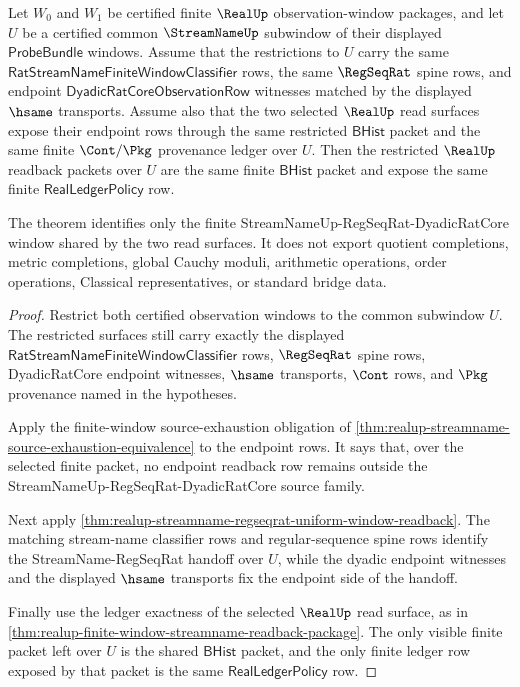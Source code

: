 \begin{theorem}
\label{thm:realup-streamname-regseqrat-common-window-pullback}
Let $W_0$ and $W_1$ be certified finite $\RealUp$ observation-window packages,
and let $U$ be a certified common $\StreamNameUp$ subwindow of their displayed
$\mathsf{ProbeBundle}$ windows. Assume that the restrictions to $U$ carry the
same $\mathsf{RatStreamNameFiniteWindowClassifier}$ rows, the same
$\RegSeqRat$ spine rows, and endpoint
$\mathsf{DyadicRatCoreObservationRow}$ witnesses matched by the displayed
$\hsame$ transports. Assume also that the two selected
$\RealUp$ read surfaces expose their endpoint rows through the same restricted
$\mathsf{BHist}$ packet and the same finite $\Cont/\Pkg$ provenance ledger over
$U$. Then the restricted $\RealUp$ readback packets over $U$ are the same
finite $\mathsf{BHist}$ packet and expose the same finite
$\mathsf{RealLedgerPolicy}$ row.

The theorem identifies only the finite StreamNameUp-RegSeqRat-DyadicRatCore
window shared by the two read surfaces. It does not export quotient
completions, metric completions, global Cauchy moduli, arithmetic operations,
order operations, Classical representatives, or standard bridge data.
\end{theorem}
\begin{proof}
Restrict both certified observation windows to the common subwindow $U$. The
restricted surfaces still carry exactly the displayed
$\mathsf{RatStreamNameFiniteWindowClassifier}$ rows, $\RegSeqRat$ spine rows,
DyadicRatCore endpoint witnesses, $\hsame$ transports, $\Cont$ rows, and
$\Pkg$ provenance named in the hypotheses.

Apply the finite-window source-exhaustion obligation of
\autoref{thm:realup-streamname-source-exhaustion-equivalence} to the endpoint
rows. It says that, over the selected finite packet, no endpoint readback row
remains outside the StreamNameUp-RegSeqRat-DyadicRatCore source family.

Next apply
\autoref{thm:realup-streamname-regseqrat-uniform-window-readback}. The matching
stream-name classifier rows and regular-sequence spine rows identify the
StreamName-RegSeqRat handoff over $U$, while the dyadic endpoint witnesses and
the displayed $\hsame$ transports fix the endpoint side of the handoff.

Finally use the ledger exactness of the selected $\RealUp$ read surface, as in
\autoref{thm:realup-finite-window-streamname-readback-package}. The only
visible finite packet left over $U$ is the shared $\mathsf{BHist}$ packet, and
the only finite ledger row exposed by that packet is the same
$\mathsf{RealLedgerPolicy}$ row.
\end{proof}


